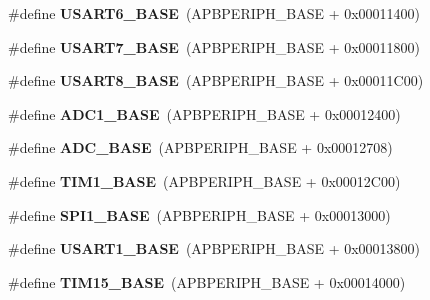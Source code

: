 \begin{DoxyCompactItemize}
\#define {\bfseries U\+S\+A\+R\+T6\+\_\+\+B\+A\+SE}~(A\+P\+B\+P\+E\+R\+I\+P\+H\+\_\+\+B\+A\+SE + 0x00011400)
\item 
\mbox{\label{group___peripheral__memory__map_gac13dda65640b4f3a36d72b036367c66e}} 
\#define {\bfseries U\+S\+A\+R\+T7\+\_\+\+B\+A\+SE}~(A\+P\+B\+P\+E\+R\+I\+P\+H\+\_\+\+B\+A\+SE + 0x00011800)
\item 
\mbox{\label{group___peripheral__memory__map_ga2babded304d71c7be3e3bb4d2c0295bb}} 
\#define {\bfseries U\+S\+A\+R\+T8\+\_\+\+B\+A\+SE}~(A\+P\+B\+P\+E\+R\+I\+P\+H\+\_\+\+B\+A\+SE + 0x00011\+C00)
\item 
\mbox{\label{group___peripheral__memory__map_ga695c9a2f892363a1c942405c8d351b91}} 
\#define {\bfseries A\+D\+C1\+\_\+\+B\+A\+SE}~(A\+P\+B\+P\+E\+R\+I\+P\+H\+\_\+\+B\+A\+SE + 0x00012400)
\item 
\mbox{\label{group___peripheral__memory__map_gad06cb9e5985bd216a376f26f22303cd6}} 
\#define {\bfseries A\+D\+C\+\_\+\+B\+A\+SE}~(A\+P\+B\+P\+E\+R\+I\+P\+H\+\_\+\+B\+A\+SE + 0x00012708)
\item 
\mbox{\label{group___peripheral__memory__map_gaf8aa324ca5011b8173ab16585ed7324a}} 
\#define {\bfseries T\+I\+M1\+\_\+\+B\+A\+SE}~(A\+P\+B\+P\+E\+R\+I\+P\+H\+\_\+\+B\+A\+SE + 0x00012\+C00)
\item 
\mbox{\label{group___peripheral__memory__map_ga50cd8b47929f18b05efbd0f41253bf8d}} 
\#define {\bfseries S\+P\+I1\+\_\+\+B\+A\+SE}~(A\+P\+B\+P\+E\+R\+I\+P\+H\+\_\+\+B\+A\+SE + 0x00013000)
\item 
\mbox{\label{group___peripheral__memory__map_ga86162ab3f740db9026c1320d46938b4d}} 
\#define {\bfseries U\+S\+A\+R\+T1\+\_\+\+B\+A\+SE}~(A\+P\+B\+P\+E\+R\+I\+P\+H\+\_\+\+B\+A\+SE + 0x00013800)
\item 
\mbox{\label{group___peripheral__memory__map_ga7ab42ce1846930569d742d339b554078}} 
\#define {\bfseries T\+I\+M15\+\_\+\+B\+A\+SE}~(A\+P\+B\+P\+E\+R\+I\+P\+H\+\_\+\+B\+A\+SE + 0x00014000)

\end{DoxyCompactItemize}

